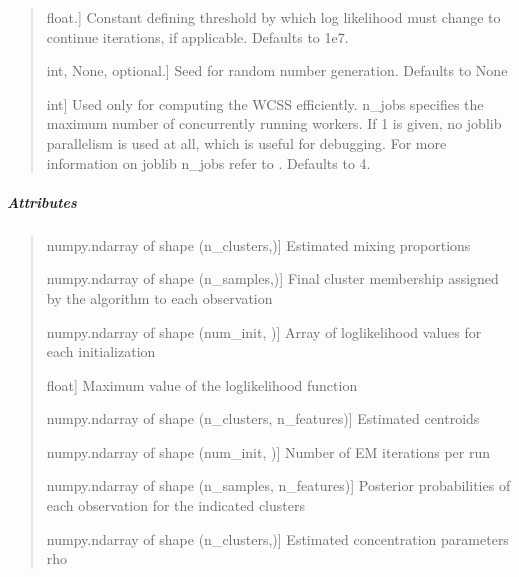 \documentclass[letterpaper,10pt,english,openany,oneside]{sphinxmanual}
\begin{document}
{{{{\begin{fulllineitems}
\begin{quote}
\begin{description}
\sphinxlineitem{tol}{[}float.{]}
\sphinxAtStartPar
Constant defining threshold by which log
likelihood must change to continue iterations, if applicable.
Defaults to 1e\sphinxhyphen{}7.

\sphinxlineitem{random\_state}{[}int, None, optional.{]}
\sphinxAtStartPar
Seed for random number generation. Defaults to None

\sphinxlineitem{n\_jobs}{[}int{]}
\sphinxAtStartPar
Used only for computing the WCSS efficiently.
n\_jobs specifies the maximum number of concurrently running workers.
If 1 is given, no joblib parallelism is used at all, which is useful for debugging.
For more information on joblib n\_jobs refer to \sphinxhyphen{}
.
Defaults to 4.

\end{description}
\end{quote}


\subparagraph{Attributes}
\label{\detokenize{api_reference/generated/QuadratiK.spherical_clustering.PKBC:attributes}}\begin{quote}
\begin{description}
\sphinxlineitem{alpha\_}{[}numpy.ndarray of shape (n\_clusters,){]}
\sphinxAtStartPar
Estimated mixing proportions

\sphinxlineitem{labels\_}{[}numpy.ndarray of shape (n\_samples,){]}
\sphinxAtStartPar
Final cluster membership assigned by the algorithm to each observation

\sphinxlineitem{log\_lik\_vec}{[}numpy.ndarray of shape (num\_init, ){]}
\sphinxAtStartPar
Array of log\sphinxhyphen{}likelihood values for each initialization

\sphinxlineitem{loklik\_}{[}float{]}
\sphinxAtStartPar
Maximum value of the log\sphinxhyphen{}likelihood function

\sphinxlineitem{mu\_}{[}numpy.ndarray of shape (n\_clusters, n\_features){]}
\sphinxAtStartPar
Estimated centroids

\sphinxlineitem{num\_iter\_per\_run}{[}numpy.ndarray of shape (num\_init, ){]}
\sphinxAtStartPar
Number of E\sphinxhyphen{}M iterations per run

\sphinxlineitem{post\_probs\_}{[}numpy.ndarray of shape (n\_samples, n\_features){]}
\sphinxAtStartPar
Posterior probabilities of each observation for the indicated clusters

\sphinxlineitem{rho\_}{[}numpy.ndarray of shape (n\_clusters,){]}
\sphinxAtStartPar
Estimated concentration parameters rho


\end{description}
\end{quote}
\end{fulllineitems}}}}}
\end{document}
